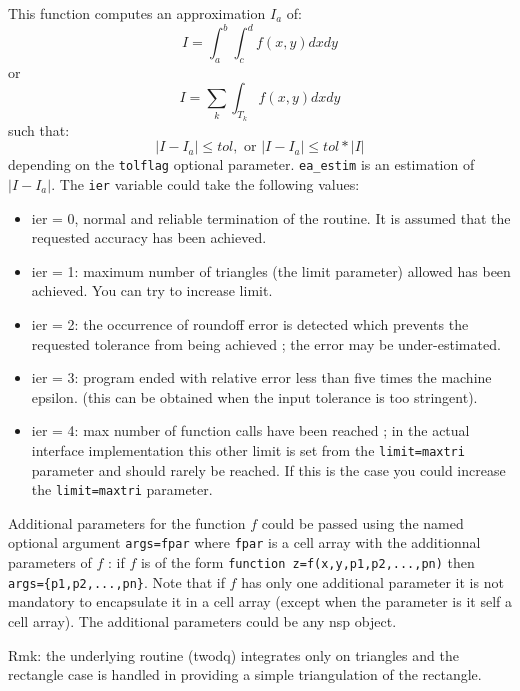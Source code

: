 \begin{mandescription}
This function computes an approximation $I_a$ of:
$$
   I = \int_a^b \int_c^d f(x,y) dxdy
$$
or
$$
   I = \sum_k \int_{T_k} f(x,y) dxdy
$$
such that:
$$
   | I - I_a | \le  tol, \mbox{ or } | I - I_a | \le  tol*|I|
$$
depending on the \verb+tolflag+ optional parameter.
 \verb+ea_estim+ is an estimation of $| I - I_a |$. The
\verb+ier+ variable could take the following values: 
\begin{itemize}
\item ier = 0,  normal and reliable termination of the routine. It is assumed that the
      requested  accuracy has been achieved.
\item ier = 1: maximum number of triangles (the limit
      parameter) allowed has been achieved. You can try to
      increase limit.
\item ier = 2: the occurrence of roundoff error is detected
      which prevents the requested tolerance from being
      achieved ; the error may be under-estimated.
\item ier = 3: program ended with relative error less than five times the machine epsilon.
      (this can be obtained when the input tolerance is too stringent).
\item ier = 4: max number of function calls have been reached ;
      in the actual interface implementation this other limit is set
      from the \verb+limit=maxtri+ parameter and should rarely be
      reached. If this is the case you could increase the
      \verb+limit=maxtri+ parameter.
\end{itemize}

Additional parameters for the function $f$ could be passed using the
named optional argument \verb+args=fpar+ where \verb+fpar+ is a cell array
with the additionnal parameters of $f$ : if $f$ is of the form 
\verb+function z=f(x,y,p1,p2,...,pn)+ then \verb+args={p1,p2,...,pn}+.
Note that if $f$ has only one additional parameter it is not mandatory 
to encapsulate it in a cell array (except when the parameter is it 
self a cell array). The additional parameters could be any nsp object.

Rmk: the underlying routine (twodq) integrates only on triangles and
the rectangle case is handled in providing a simple triangulation of
the rectangle. 
\end{mandescription}

